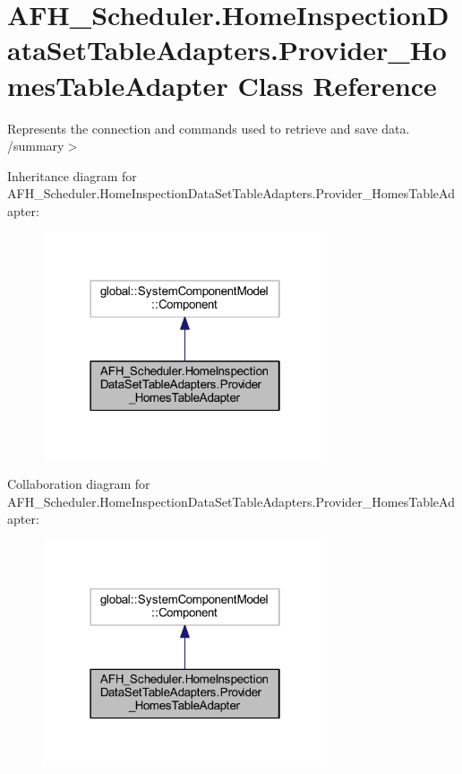 \section{A\+F\+H\+\_\+\+Scheduler.\+Home\+Inspection\+Data\+Set\+Table\+Adapters.\+Provider\+\_\+\+Homes\+Table\+Adapter Class Reference}
\label{class_a_f_h___scheduler_1_1_home_inspection_data_set_table_adapters_1_1_provider___homes_table_adapter}


Represents the connection and commands used to retrieve and save data. /summary$>$  




Inheritance diagram for A\+F\+H\+\_\+\+Scheduler.\+Home\+Inspection\+Data\+Set\+Table\+Adapters.\+Provider\+\_\+\+Homes\+Table\+Adapter\+:
\nopagebreak
\begin{figure}[H]
\begin{center}
\leavevmode
\includegraphics[width=238pt]{class_a_f_h___scheduler_1_1_home_inspection_data_set_table_adapters_1_1_provider___homes_table_adapter__inherit__graph}
\end{center}
\end{figure}


Collaboration diagram for A\+F\+H\+\_\+\+Scheduler.\+Home\+Inspection\+Data\+Set\+Table\+Adapters.\+Provider\+\_\+\+Homes\+Table\+Adapter\+:
\nopagebreak
\begin{figure}[H]
\begin{center}
\leavevmode
\includegraphics[width=238pt]{class_a_f_h___scheduler_1_1_home_inspection_data_set_table_adapters_1_1_provider___homes_table_adapter__coll__graph}
\end{center}
\end{figure}
